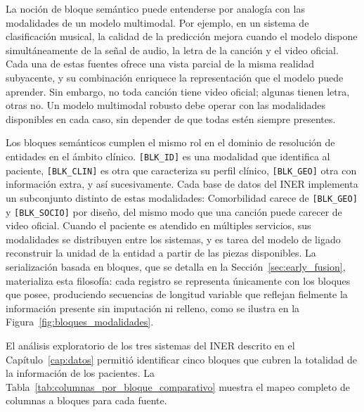 La noción de bloque semántico puede entenderse por analogía con las modalidades de un modelo multimodal. Por ejemplo, en un sistema de clasificación musical, la calidad de la predicción mejora cuando el modelo dispone simultáneamente de la señal de audio, la letra de la canción y el video oficial. Cada una de estas fuentes ofrece una vista parcial de la misma realidad subyacente, y su combinación enriquece la representación que el modelo puede aprender. Sin embargo, no toda canción tiene video oficial; algunas tienen letra, otras no. Un modelo multimodal robusto debe operar con las modalidades disponibles en cada caso, sin depender de que todas estén siempre presentes.

Los bloques semánticos cumplen el mismo rol en el dominio de resolución de entidades en el ámbito clínico. \texttt{[BLK\_ID]} es una modalidad que identifica al paciente, \texttt{[BLK\_CLIN]} es otra que caracteriza su perfil clínico, \texttt{[BLK\_GEO]} otra con información extra, y así sucesivamente. Cada base de datos del INER implementa un subconjunto distinto de estas modalidades: Comorbilidad carece de \texttt{[BLK\_GEO]} y \texttt{[BLK\_SOCIO]} por diseño, del mismo modo que una canción puede carecer de video oficial. Cuando el paciente es atendido en múltiples servicios, sus modalidades se distribuyen entre los sistemas, y es tarea del modelo de ligado reconstruir la unidad de la entidad a partir de las piezas disponibles. La serialización basada en bloques, que se detalla en la Sección~\ref{sec:early_fusion}, materializa esta filosofía: cada registro se representa únicamente con los bloques que posee, produciendo secuencias de longitud variable que reflejan fielmente la información presente sin imputación ni relleno, como se ilustra en la Figura~\ref{fig:bloques_modalidades}.



El análisis exploratorio de los tres sistemas del INER descrito en el Capítulo~\ref{cap:datos} permitió identificar cinco bloques que cubren la totalidad de la información de los pacientes. La Tabla~\ref{tab:columnas_por_bloque_comparativo} muestra el mapeo completo de columnas a bloques para cada fuente.

